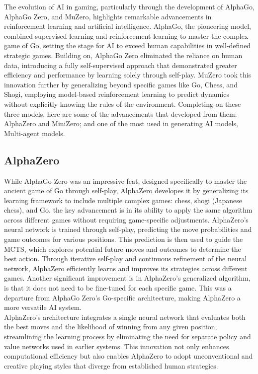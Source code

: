 The evolution of AI in gaming, particularly through the development 
of AlphaGo, AlphaGo Zero, and MuZero, highlights remarkable advancements
in reinforcement learning and artificial intelligence. AlphaGo, the pioneering model, 
combined supervised learning and reinforcement learning to master the 
complex game of Go, setting the stage for AI to exceed human capabilities 
in well-defined strategic games. Building on, AlphaGo 
Zero eliminated the reliance on human data, introducing a fully 
self-supervised approach that demonstrated greater efficiency and 
performance by learning solely through self-play. MuZero took this 
innovation further by generalizing beyond specific games like Go, 
Chess, and Shogi, employing model-based reinforcement learning to 
predict dynamics without explicitly knowing the rules of the environment.
Completing on these three models, here are some of the advancements that 
developed from them: AlphaZero and MiniZero; and one of the most used 
in generating AI models, Multi-agent models. 
\subsection*{AlphaZero}
While AlphaGo Zero was an impressive feat, designed specifically to 
master the ancient game of Go through self-play, AlphaZero developes it 
by generalizing its learning framework to 
include multiple complex games: chess, shogi (Japanese chess), and Go. 
the key advancement is in its ability to apply the same algorithm 
across different games without requiring game-specific adjustments. 
AlphaZero's neural network is trained through self-play, predicting 
the move probabilities and game outcomes for various positions. This 
prediction is then used to guide the MCTS, which explores potential 
future moves and outcomes to determine the best action. Through 
iterative self-play and continuous refinement of the neural network, 
AlphaZero efficiently learns and improves its strategies across 
different games\cite{AD3}.
Another significant improvement is in AlphaZero’s generalized algorithm, 
is that it does not need to be fine-tuned for each specific game. This was 
a departure from AlphaGo Zero’s Go-specific architecture, making 
AlphaZero a more versatile AI system.\\ AlphaZero's architecture integrates a 
single neural network that evaluates both the best moves and the 
likelihood of winning from any given position, streamlining the 
learning process by eliminating the need for separate policy and 
value networks used in earlier systems. This innovation not only
enhances computational efficiency but also enables AlphaZero to adopt 
unconventional and creative playing styles that diverge from 
established human strategies.
